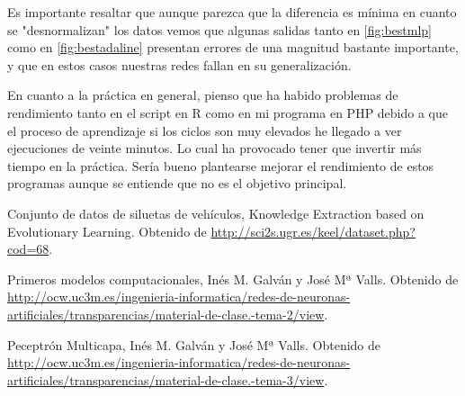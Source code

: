 \documentclass[11pt,spanish,listoffigures,listoftables]{workluis}
\begin{document}
\par Es importante resaltar que aunque parezca que la diferencia es mínima en cuanto se "desnormalizan" los datos vemos que algunas salidas tanto en \ref{fig:bestmlp} como en \ref{fig:bestadaline} presentan errores de una magnitud bastante importante, y que en estos casos nuestras redes fallan en su generalización.

\par En cuanto a la práctica en general, pienso que ha habido problemas de rendimiento tanto en el script en R como en mi programa en PHP debido a que el proceso de aprendizaje si los ciclos son muy elevados he llegado a ver ejecuciones de veinte minutos. Lo cual ha provocado tener que invertir más tiempo en la práctica. Sería bueno plantearse mejorar el rendimiento de estos programas aunque se entiende que no es el objetivo principal.


\begin{thebibliography}{10}


   Conjunto de datos de siluetas de vehículos, 
   \newblock Knowledge Extraction based on Evolutionary Learning. 
   \newblock Obtenido de
   \url{http://sci2s.ugr.es/keel/dataset.php?cod=68}.

   Primeros modelos computacionales, 
   \newblock Inés M. Galván y José Mª Valls.
   \newblock Obtenido de
   \url{http://ocw.uc3m.es/ingenieria-informatica/redes-de-neuronas-artificiales/transparencias/material-de-clase.-tema-2/view}.

   Peceptrón Multicapa, 
   \newblock Inés M. Galván y José Mª Valls.
   \newblock Obtenido de
   \url{http://ocw.uc3m.es/ingenieria-informatica/redes-de-neuronas-artificiales/transparencias/material-de-clase.-tema-3/view}.

\end{thebibliography}
\cleardoublepage

\end{document}
